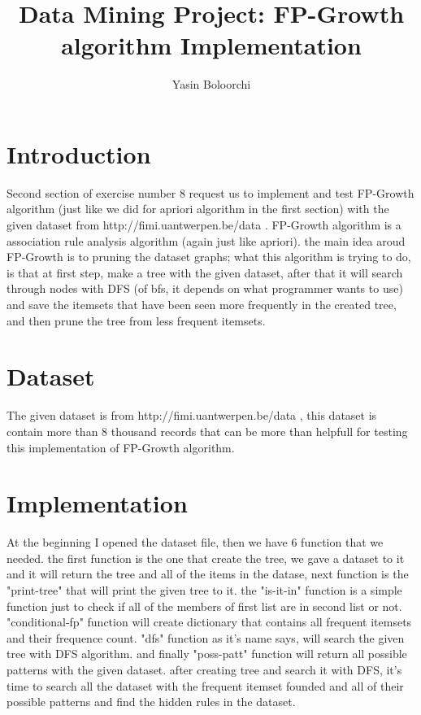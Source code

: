 \documentclass[a4paper]{article}
\begin{document}
\title{Data Mining Project: FP-Growth algorithm Implementation}
\author{Yasin Boloorchi}

\maketitle

\section{Introduction}	\label{section.intro}
	Second section of exercise number 8 request us to implement and test FP-Growth algorithm (just like we did for apriori algorithm in the first section) with the given dataset from http://fimi.uantwerpen.be/data . FP-Growth algorithm is a association rule analysis algorithm (again just like apriori). the main idea aroud FP-Growth is to pruning the dataset graphs; what this algorithm is trying to do, is that at first step, make a tree with the given dataset, after that it will search through nodes with DFS (of bfs, it depends on what programmer wants to use) and save the itemsets that have been seen more frequently in the created tree, and then prune the tree from less frequent itemsets.
	
\section{Dataset}
	The given dataset is from http://fimi.uantwerpen.be/data , this dataset is contain more than 8 thousand records that can be more than helpfull for testing this implementation of FP-Growth algorithm. 

\section{Implementation}	\label{section.implement}
	At the beginning I opened the dataset file, then we have 6 function that we needed. the first function is the one that create the tree, we gave a dataset to it and it will return the tree and all of the items in the datase, next function is the "print-tree" that will print the given tree to it. the "is-it-in" function is a simple function just to check if all of the members of first list are in second list or not. "conditional-fp" function will create dictionary that contains all frequent itemsets and their frequence count. "dfs" function as it's name says, will search the given tree with DFS algorithm. and finally "poss-patt" function will return all possible patterns with the given dataset.
	after creating tree and search it with DFS, it's time to search all the dataset with the frequent itemset founded and all of their possible patterns and find the hidden rules in the dataset.
	
\end{document}

